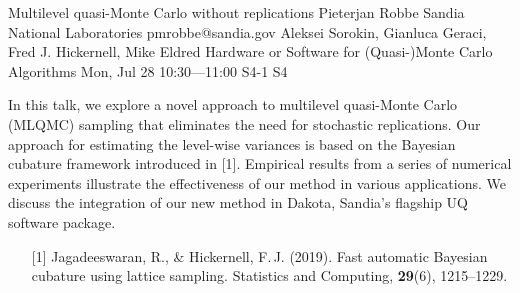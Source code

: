 \begin{talk}
  {Multilevel quasi-Monte Carlo without replications}%
  {Pieterjan Robbe}%
  {Sandia National Laboratories}%
  {pmrobbe@sandia.gov}%
  {Aleksei Sorokin, Gianluca Geraci, Fred J. Hickernell, Mike Eldred}%
  {Hardware or Software for (Quasi-)Monte Carlo Algorithms}%
  {Mon, Jul 28 10:30---11:00}%
  {S4-1}%
  {S4}%
    
   
In this talk, we explore a novel approach to multilevel quasi-Monte Carlo (MLQMC) sampling that eliminates the need for stochastic replications. Our approach for estimating the level-wise variances is based on the Bayesian cubature framework introduced in [1]. Empirical results from a series of numerical experiments illustrate the effectiveness of our method in various applications. We discuss the integration of our new method in Dakota, Sandia's flagship UQ software package.

\medskip

\begin{enumerate}
  \item[{[1]}] Jagadeeswaran, R., \& Hickernell, F.\,J. (2019). Fast automatic Bayesian cubature using lattice sampling. Statistics and Computing, \textbf{29}(6), 1215--1229.
\end{enumerate}

\end{talk}


